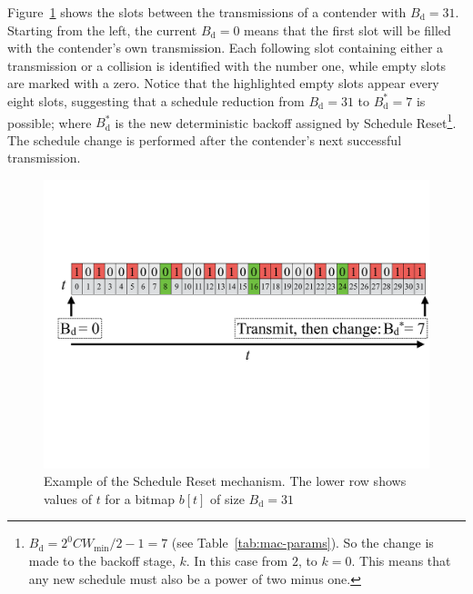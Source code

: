 	Figure~\ref{fig:scheduleReset1} shows the slots between the transmissions of a contender with $B_{\text{d}}=31$. Starting from the left, the current $B_{\text{d}}=0$ means that the first slot will be filled with the contender's own transmission. Each following slot containing either a transmission or a collision is identified with the number one, while empty slots are marked with a zero. Notice that the highlighted empty slots appear every eight slots, suggesting that a schedule reduction from $B_{\text{d}}=31$ to $B_{\text{d}}^{*}=7$ is possible; where $B_{\text{d}}^{*}$ is the new deterministic backoff assigned by Schedule Reset\footnote{$B_{\text{d}}=2^{0}CW_{\min}/2-1=7$ (see Table~\ref{tab:mac-params}). So the change is made to the backoff stage, $k$. In this case from $2$, to $k=0$. This means that any new schedule must also be a power of two minus one.}. The schedule change is performed after the contender's next successful transmission.
	
		\begin{figure}[tb]
		\centering
			\includegraphics[width=\linewidth]{figures/tonFigs/scheduleReset.pdf}
			\caption{Example of the Schedule Reset mechanism. The lower row shows values of $t$ for a bitmap $b[t]$ of size $B_{\text{d}}=31$}
			\label{fig:scheduleReset1}
		\end{figure}
		
